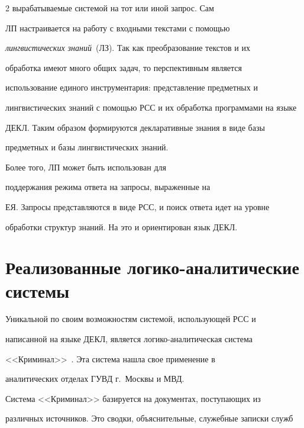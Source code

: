 \begin{multicols}{2}
вырабатываемые системой на тот или иной запрос. Сам


ЛП настраивается на работу с входными текстами с помощью


\textit{лингвистических знаний}~(ЛЗ). Так как преобразование текстов и их


обработка имеют много общих задач, то перспективным является


использование единого инструментария: представление предметных и


лингвистических знаний с помощью РСС и их обработка программами на языке


ДЕКЛ. Таким образом формируются декларативные знания в виде базы


предметных и базы лингвистических знаний.





 Более того, ЛП может быть использован для


поддержания режима ответа на запросы, выраженные на


ЕЯ. Запросы представляются в виде РСС, и поиск ответа идет на уровне


обработки структур знаний. На это и ориентирован язык ДЕКЛ.








\vspace*{-6pt}





\section{Реализованные логико-аналитические системы} %





 Уникальной по своим возможностям системой, использующей РСС и


написанной на языке ДЕКЛ, является ло\-ги\-ко-ана\-ли\-ти\-че\-ская система


<<Криминал>>~\cite{ma-l7, ma-l8}. Эта система нашла свое применение в


аналитических отделах ГУВД г.~Москвы и МВД.





 Система <<Криминал>> базируется на документах, поступающих из


различных источников. Это сводки, объяснительные, служебные записки служб



\end{multicols}
